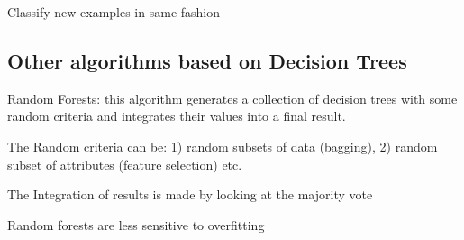 Classify new examples in same fashion

\subsection{Other algorithms based on Decision Trees}
Random Forests: this algorithm generates a collection of decision trees with some random criteria and integrates their values into a final result.

The Random criteria can be: 1) random subsets of data (bagging), 2) random subset of attributes (feature selection) etc.

The Integration of results is made by looking at the majority vote

Random forests are less sensitive to overfitting

